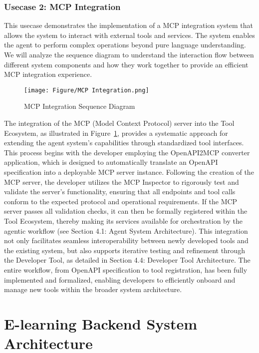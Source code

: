 \documentclass[../Main.tex]{subfiles}
\begin{document}
	\subsubsection{Usecase 2: MCP Integration}
	This usecase demonstrates the implementation of a MCP integration system that
	allows the system to interact with external tools and services. The system enables
	the agent to perform complex operations beyond pure language understanding. We
	will analyze the sequence diagram to understand the interaction flow between
	different system components and how they work together to provide an efficient
	MCP integration experience.

	\begin{figure}[H]
		\centering
		\texttt{[image: Figure/MCP Integration.png]}
		\caption{MCP Integration Sequence Diagram}
		\label{fig:MCP_Integration_Sequence_Diagram}
	\end{figure}

	The integration of the MCP (Model Context Protocol) server into the Tool Ecosystem,
	as illustrated in Figure~\ref{fig:MCP_Integration_Sequence_Diagram}, provides a
	systematic approach for extending the agent system's capabilities through standardized
	tool interfaces. This process begins with the developer employing the
	OpenAPI2MCP converter application, which is designed to automatically translate
	an OpenAPI specification into a deployable MCP server instance. Following the
	creation of the MCP server, the developer utilizes the MCP Inspector to rigorously
	test and validate the server's functionality, ensuring that all endpoints and
	tool calls conform to the expected protocol and operational requirements. If the
	MCP server passes all validation checks, it can then be formally registered
	within the Tool Ecosystem, thereby making its services available for orchestration
	by the agentic workflow (see Section 4.1: Agent System Architecture). This integration
	not only facilitates seamless interoperability between newly developed tools and
	the existing system, but also supports iterative testing and refinement
	through the Developer Tool, as detailed in Section 4.4: Developer Tool
	Architecture. The entire workflow, from OpenAPI specification to tool
	registration, has been fully implemented and formalized, enabling developers
	to efficiently onboard and manage new tools within the broader system
	architecture.

	\section{E-learning Backend System Architecture}
	\label{section:4.2_e_learning_backend_system_architecture}
\end{document}
